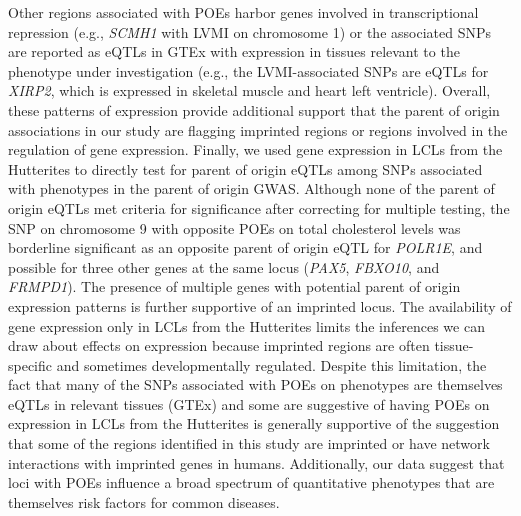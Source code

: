 Other regions associated with POEs harbor genes involved in transcriptional repression (e.g., \emph{SCMH1} with LVMI on chromosome 1) or the associated SNPs are reported as eQTLs in GTEx with expression in tissues relevant to the phenotype under investigation (e.g., the LVMI-associated SNPs are eQTLs for \emph{XIRP2}, which is expressed in skeletal muscle and heart left ventricle)\cite{Consortium2015}. Overall, these patterns of expression provide additional support that the parent of origin associations in our study are flagging imprinted regions or regions involved in the regulation of gene expression. Finally, we used gene expression in LCLs from the Hutterites to directly test for parent of origin eQTLs among SNPs associated with phenotypes in the parent of origin GWAS. Although none of the parent of origin eQTLs met criteria for significance after correcting for multiple testing, the SNP on chromosome 9 with opposite POEs on total cholesterol levels was borderline significant as an opposite parent of origin eQTL for \emph{POLR1E}, and possible for three other genes at the same locus (\emph{PAX5}, \emph{FBXO10}, and \emph{FRMPD1}). The presence of multiple genes with potential parent of origin expression patterns is further supportive of an imprinted locus. The availability of gene expression only in LCLs from the Hutterites limits the inferences we can draw about effects on expression because imprinted regions are often tissue-specific and sometimes developmentally regulated\cite{Peters2014,Falls1999}. Despite this limitation, the fact that many of the SNPs associated with POEs on phenotypes are themselves eQTLs in relevant tissues (GTEx) and some are suggestive of having POEs on expression in LCLs from the Hutterites is generally supportive of the suggestion that some of the regions identified in this study are imprinted or have network interactions with imprinted genes\cite{Chess:2016fs} in humans. Additionally, our data suggest that loci with POEs influence a broad spectrum of quantitative phenotypes that are themselves risk factors for common diseases. 

